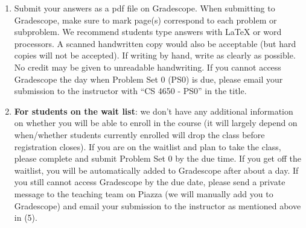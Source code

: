 \documentclass[11pt, letterpaper]{article}
\begin{document}
\begin{enumerate}
    \item Submit your answers as a pdf file on Gradescope. When submitting to Gradescope, make sure to mark page(s) correspond to each problem or subproblem. We recommend students type answers with LaTeX or word processors. A scanned handwritten copy would also be acceptable (but hard copies will not be accepted). If writing by hand, write as clearly as possible. No credit may be given to unreadable handwriting. If you cannot access Gradescope the day when Problem Set 0 (PS0) is due, please email your submission to the instructor with ``CS 4650 - PS0'' in the title. 
    
    \item \textbf{For students on the wait list}: we don't have any additional information on whether you will be able to enroll in the course (it will largely depend on when/whether students currently enrolled will drop the class before registration closes). If you are on the waitlist and plan to take the class, please complete and submit Problem Set 0 by the due time. If you get off the waitlist, you will be automatically added to Gradescope after about a day. If you still cannot access Gradescope by the due date, please send a private message to the teaching team on Piazza (we will manually add you to Gradescope) and email your submission to the instructor as mentioned above in (5).
\end{enumerate}

\newpage
\end{document}
